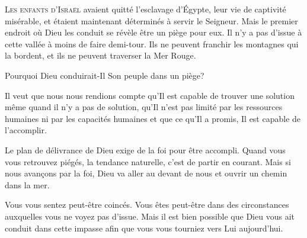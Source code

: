 



\lettrine{L}{es enfants d'Israël} avaient quitté l'esclavage d'Égypte,
 leur vie de captivité misérable,
 et étaient maintenant déterminés à servir le Seigneur.
 Mais le premier endroit où Dieu les conduit se révèle être un piège pour eux.
 Il n'y a pas d'issue à cette vallée à moins de faire demi-tour.
 Ils ne peuvent franchir les montagnes qui la bordent,
 et ils ne peuvent traverser la Mer Rouge.

Pourquoi Dieu conduirait-Il Son peuple dans un piège?


Il veut que nous nous rendions compte qu'Il est capable de trouver une solution
 même quand il n'y a pas de solution,
 qu'Il n'est pas limité par les ressources humaines
 ni par les capacités humaines et que ce qu'Il a promis,
 Il est capable de l'accomplir.

Le plan de délivrance de Dieu exige de la foi pour être accompli.
 Quand vous vous retrouvez piégés, la tendance naturelle,
 c'est de partir en courant.
 Mais si nous avan\c{c}ons par la foi,
 Dieu va aller au devant de nous et ouvrir un chemin dans la mer.

Vous vous sentez peut-être coincés.
 Vous êtes peut-être dans des circonstances
 auxquelles vous ne voyez pas d'issue.
 Mais il est bien possible que Dieu vous ait conduit dans cette impasse
 afin que vous vous tourniez vers Lui aujourd'hui. 

\dvrule




